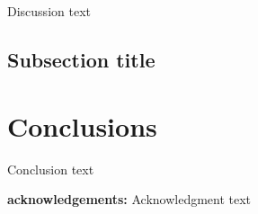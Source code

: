 Discussion text

\subsection{Subsection title}

\section{Conclusions}

Conclusion text

\textbf{acknowledgements:}
Acknowledgment text

%



%
%  
